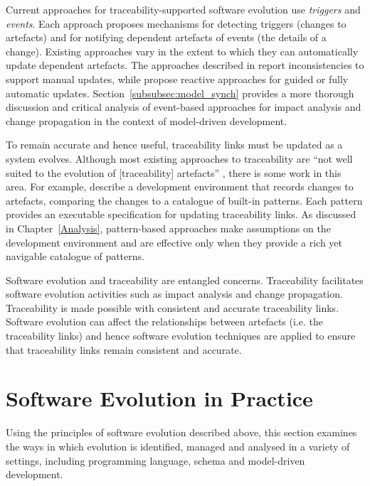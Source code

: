 Current approaches for traceability-supported software evolution use \emph{triggers} and \emph{events}. Each approach proposes mechanisms for detecting triggers (changes to artefacts) and for notifying dependent artefacts of events (the details of a change). Existing approaches vary in the extent to which they can automatically update dependent artefacts. The approaches described in \cite{chen99consistency,cleland03eventbased} report inconsistencies to support manual updates, while \cite{aizenbud05operational,costa2007rtmdd} propose reactive approaches for guided or fully automatic updates. Section~\ref{subsubsec:model_synch} provides a more thorough discussion and critical analysis of event-based approaches for impact analysis and change propagation in the context of model-driven development.

To remain accurate and hence useful, traceability links must be updated as a system evolves. Although most existing approaches to traceability are ``not well suited to the evolution of [traceability] artefacts'' \cite[pg24]{winkler09survey}, there is some work in this area. For example, \cite{mader08rule} describe a development environment that records changes to artefacts, comparing the changes to a catalogue of built-in patterns. Each pattern provides an executable specification for updating traceability links. As discussed in Chapter~\ref{Analysis}, pattern-based approaches make assumptions on the development environment and are effective only when they provide a rich yet navigable catalogue of patterns. 

Software evolution and traceability are entangled concerns. Traceability facilitates software evolution activities such as impact analysis and change propagation. Traceability is made possible with consistent and accurate traceability links. Software evolution can affect the relationships between artefacts (i.e. the traceability links) and hence software evolution techniques are applied to ensure that traceability links remain consistent and accurate.

\section{Software Evolution in Practice}
\label{sec:software_evolution_practice}
Using the principles of software evolution described above, this section examines the ways in which evolution is identified, managed and analysed in a variety of settings, including programming language, schema and model-driven development. 

